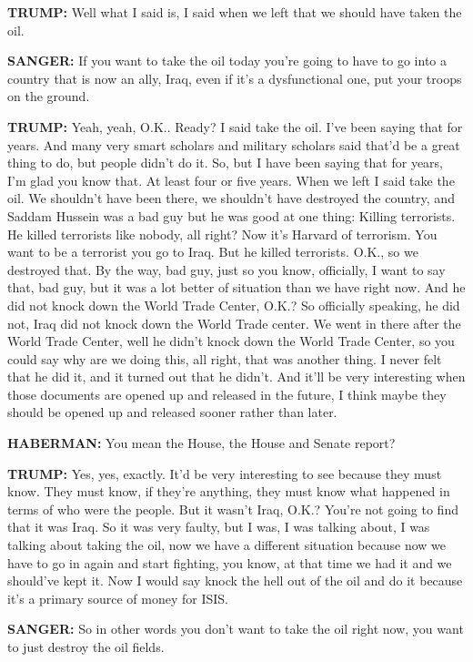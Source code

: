 \textbf{TRUMP:} Well what I said is, I said when we left that we should
have taken the oil.

\textbf{SANGER:} If you want to take the oil today you're going to have
to go into a country that is now an ally, Iraq, even if it's a
dysfunctional one, put your troops on the ground.

\textbf{TRUMP:} Yeah, yeah, O.K.. Ready? I said take the oil. I've been
saying that for years. And many very smart scholars and military
scholars said that'd be a great thing to do, but people didn't do it.
So, but I have been saying that for years, I'm glad you know that. At
least four or five years. When we left I said take the oil. We shouldn't
have been there, we shouldn't have destroyed the country, and Saddam
Hussein was a bad guy but he was good at one thing: Killing terrorists.
He killed terrorists like nobody, all right? Now it's Harvard of
terrorism. You want to be a terrorist you go to Iraq. But he killed
terrorists. O.K., so we destroyed that. By the way, bad guy, just so you
know, officially, I want to say that, bad guy, but it was a lot better
of situation than we have right now. And he did not knock down the World
Trade Center, O.K.? So officially speaking, he did not, Iraq did not
knock down the World Trade center. We went in there after the World
Trade Center, well he didn't knock down the World Trade Center, so you
could say why are we doing this, all right, that was another thing. I
never felt that he did it, and it turned out that he didn't. And it'll
be very interesting when those documents are opened up and released in
the future, I think maybe they should be opened up and released sooner
rather than later.

\textbf{HABERMAN:} You mean the House, the House and Senate report?

\textbf{TRUMP:} Yes, yes, exactly. It'd be very interesting to see
because they must know. They must know, if they're anything, they must
know what happened in terms of who were the people. But it wasn't Iraq,
O.K.? You're not going to find that it was Iraq. So it was very faulty,
but I was, I was talking about, I was talking about taking the oil, now
we have a different situation because now we have to go in again and
start fighting, you know, at that time we had it and we should've kept
it. Now I would say knock the hell out of the oil and do it because it's
a primary source of money for ISIS.

\textbf{SANGER:} So in other words you don't want to take the oil right
now, you want to just destroy the oil fields.


